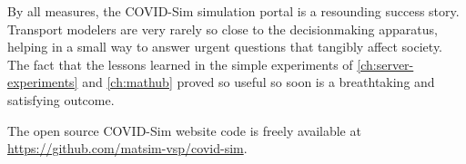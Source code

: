 By all measures, the COVID-Sim simulation portal is a resounding success story. Transport modelers are very rarely so close to the decisionmaking apparatus, helping in a small way to answer urgent questions that tangibly affect society. The fact that the lessons learned in the simple experiments of \autoref{ch:server-experiments} and \autoref{ch:mathub} proved so useful so soon is a breathtaking and satisfying outcome.

The open source COVID-Sim website code is freely available at \url{https://github.com/matsim-vsp/covid-sim}.
